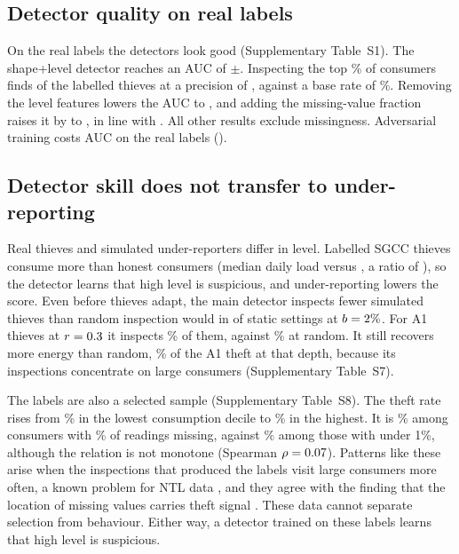 \documentclass[journal]{IEEEtran}
\begin{document}
\subsection{Detector quality on real labels}\label{sec:res-det}
On the real labels the detectors look good (Supplementary Table~S1). The shape+level detector reaches an AUC of \rAucLevel$\pm$\rAucSdLevel{}. Inspecting the top \rBmid\% of consumers finds \rRecLevel{} of the labelled thieves at a precision of \rPrecLevel{}, against a base rate of \rBaseRate\%. Removing the level features lowers the AUC to \rAucShape{}, and adding the missing-value fraction raises it by \rMissGain{} to \rAucMiss{}, in line with \cite{alfian2026}. All other results exclude missingness. Adversarial training costs AUC on the real labels (\rAucAdv{}).

\subsection{Detector skill does not transfer to under-reporting}\label{sec:res-static}
Real thieves and simulated under-reporters differ in level. Labelled SGCC thieves consume more than honest consumers (median daily load \rMedLoadThief{} versus \rMedLoadHonest{}, a ratio of \rLoadRatio{}), so the detector learns that high level is suspicious, and under-reporting lowers the score. Even before thieves adapt, the main detector inspects fewer simulated thieves than random inspection would in \rStatRecallBelowRandom{} of \rStatCells{} static settings at $b=2\%$. For A1 thieves at $r=0.3$ it inspects \rStatRecallOneLow\% of them, against \rBmid\% at random. It still recovers more energy than random, \rStatRecEOneLow\% of the A1 theft at that depth, because its inspections concentrate on large consumers (Supplementary Table~S7).

The labels are also a selected sample (Supplementary Table~S8). The theft rate rises from \rDecLo\% in the lowest consumption decile to \rDecHi\% in the highest. It is \rMissPeak\% among consumers with \rMissPeakBin\% of readings missing, against \rMissFirst\% among those with under 1\%, although the relation is not monotone (Spearman $\rho=0.07$). Patterns like these arise when the inspections that produced the labels visit large consumers more often, a known problem for NTL data \cite{glauner2017big,glauner2018bias}, and they agree with the finding that the location of missing values carries theft signal \cite{fei2022}. These data cannot separate selection from behaviour. Either way, a detector trained on these labels learns that high level is suspicious.
\end{document}
